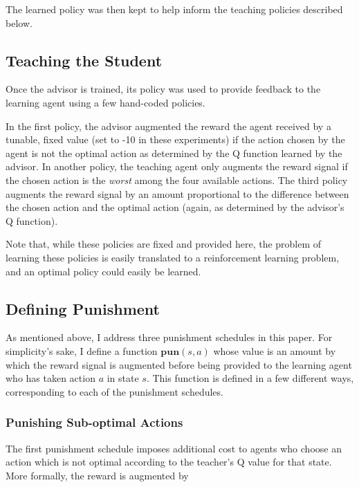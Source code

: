 \documentclass[twocolumn]{article}
\begin{document}
The learned policy was then kept to help inform the teaching policies
described below.

\hypertarget{teaching-the-student}{\subsection{Teaching the Student}\label{teaching-the-student}}

Once the advisor is trained, its policy was used to provide feedback to
the learning agent using a few hand-coded policies.

In the first policy, the advisor augmented the reward the agent received
by a tunable, fixed value (set to -10 in these experiments) if the
action chosen by the agent is not the optimal action as determined by
the Q function learned by the advisor. In another policy, the teaching
agent only augments the reward signal if the chosen action is the
\emph{worst} among the four available actions. The third policy augments
the reward signal by an amount proportional to the difference between
the chosen action and the optimal action (again, as determined by the
advisor's Q function).

Note that, while these policies are fixed and provided here, the problem
of learning these policies is easily translated to a reinforcement
learning problem, and an optimal policy could easily be learned.

\hypertarget{defining-punishment}{\subsection{Defining Punishment}\label{defining-punishment}}

As mentioned above, I address three punishment schedules in this paper.
For simplicity's sake, I define a function \(\textbf{pun}(s,a)\) whose
value is an amount by which the reward signal is augmented before being
provided to the learning agent who has taken action \(a\) in state
\(s\). This function is defined in a few different ways, corresponding
to each of the punishment schedules.

\hypertarget{punishing-sub-optimal-actions}{\subsubsection{Punishing Sub-optimal
Actions}\label{punishing-sub-optimal-actions}}

The first punishment schedule imposes additional cost to agents who
choose an action which is not optimal according to the teacher's Q value
for that state. More formally, the reward is augmented by
\end{document}
